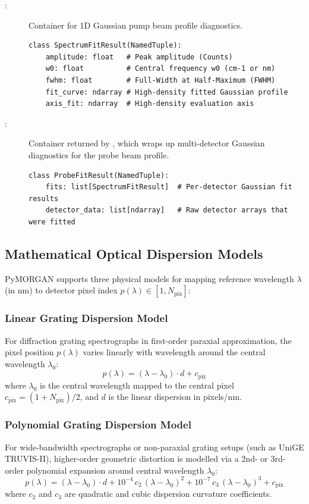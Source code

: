 \begin{description}
  \item[:] Container for 1D Gaussian pump beam profile diagnostics.
\begin{lstlisting}
class SpectrumFitResult(NamedTuple):
    amplitude: float   # Peak amplitude (Counts)
    w0: float          # Central frequency w0 (cm-1 or nm)
    fwhm: float        # Full-Width at Half-Maximum (FWHM)
    fit_curve: ndarray # High-density fitted Gaussian profile
    axis_fit: ndarray  # High-density evaluation axis
\end{lstlisting}

  \item[:] Container returned by , which
  wraps up multi-detector Gaussian diagnostics for the probe beam profile.
\begin{lstlisting}
class ProbeFitResult(NamedTuple):
    fits: list[SpectrumFitResult]  # Per-detector Gaussian fit results
    detector_data: list[ndarray]   # Raw detector arrays that were fitted
\end{lstlisting}
\end{description}

\subsection{Mathematical Optical Dispersion Models}

PyMORGAN supports three physical models for mapping reference wavelength $\lambda$ (in nm) to detector pixel index $p(\lambda) \in [1, N_\text{pix}]$:

\subsubsection{Linear Grating Dispersion Model}
For diffraction grating spectrographs in first-order paraxial approximation, the pixel position $p(\lambda)$ varies linearly with wavelength around the central wavelength $\lambda_0$:
\begin{equation}\label{eq:dispersion_linear}
  p(\lambda) = (\lambda - \lambda_0) \cdot d + c_\text{pix}
\end{equation}
where $\lambda_0$ is the central wavelength mapped to the central pixel $c_\text{pix} = (1 + N_\text{pix})/2$, and $d$ is the linear dispersion in pixels/nm.

\subsubsection{Polynomial Grating Dispersion Model}
For wide-bandwidth spectrographs or non-paraxial grating setups (such as UniGE TRUVIS-II), higher-order geometric distortion is modelled via a 2nd- or 3rd-order polynomial expansion around central wavelength $\lambda_0$:
\begin{equation}\label{eq:dispersion_poly}
  p(\lambda) = (\lambda - \lambda_0) \cdot d + 10^{-4} \, c_2 \, (\lambda - \lambda_0)^2 + 10^{-7} \, c_3 \, (\lambda - \lambda_0)^3 + c_\text{pix}
\end{equation}
where $c_2$ and $c_3$ are quadratic and cubic dispersion curvature coefficients.

